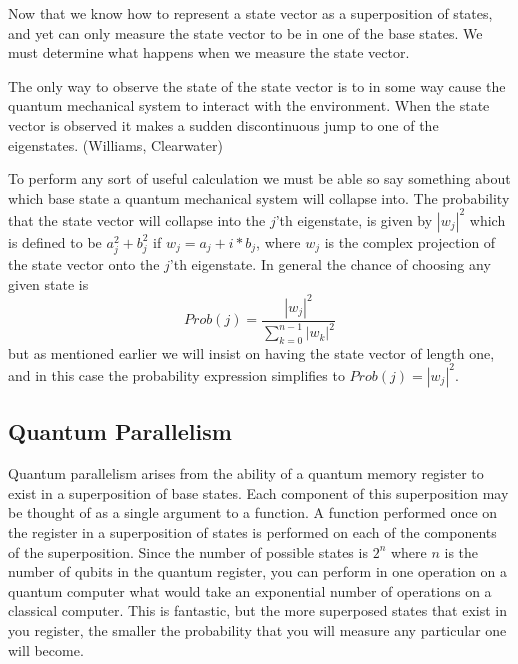 \documentclass[]{article}
\begin{document}
Now that we know how to represent a state vector as a superposition of
states, and yet can only measure the state vector to be in one of the
base states. We must determine what happens when we measure the state
vector.

The only way to observe the state of the state vector is to in some
way cause the quantum mechanical system to interact with the
environment. When the state vector is observed it makes a sudden
discontinuous jump to one of the eigenstates.  (Williams, Clearwater)

To perform any sort of useful calculation we must be able so say
something about which base state a quantum mechanical system will
collapse into. The probability that the state vector will collapse
into the $j$'th eigenstate, is given by $|w_{j}|^{2}$ which is defined
to be $a_{j}^{2} + b_{j}^{2}$ if $w_{j} = a_{j} + i*b_{j}$, where
$w_{j}$ is the complex projection of the state vector onto the $j$'th
eigenstate. In general the chance of choosing any given state is
\[Prob(j) = \frac{|w_{j}|^{2}}{\sum_{k = 0}^{ n-1} |w_{k}|^{2}}\] but
as mentioned earlier we will insist on having the state vector of
length one, and in this case the probability expression simplifies to
$Prob(j) = |w_{j}|^{2}$.

\subsection{Quantum Parallelism}

Quantum parallelism arises from the ability of a quantum memory
register to exist in a superposition of base states. Each component
of this superposition may be thought of as a single argument to a
function. A function performed once on the register in a
superposition of states is performed on each of the components of the
superposition. Since the number of possible states is $2^{n}$ where
$n$ is the number of qubits in the quantum register, you can perform
in one operation on a quantum computer what would take an exponential
number of operations on a classical computer. This is fantastic, but
the more superposed states that exist in you register, the smaller the
probability that you will measure any particular one will become.
\end{document}
